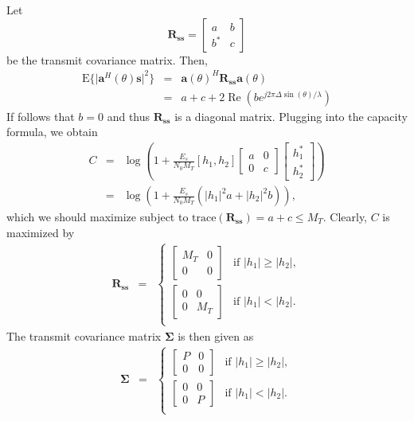 \documentclass[12pt]{article}
\begin{document}
\begin{enumerate}
Let $$\mathbf R_{\mathbf {ss}} = \begin{bmatrix} a & b \\ b^\ast & c \end{bmatrix} $$ be the transmit covariance matrix. Then,
\begin{eqnarray*}
	\mathrm{E}\{ \lvert \mathbf a^H(\theta) \mathbf s \rvert ^2 \} 
		&=& \mathbf a(\theta)^H \mathbf R_{\mathbf {ss}}\mathbf a(\theta) \\
		&=& a + c + 2 \mathop{\mathrm{Re}}(b e^{j 2\pi \Delta \sin(\theta) / \lambda}) 
\end{eqnarray*}
If follows that $b=0$ and thus $\mathbf{R_{ss}}$ is a diagonal matrix. Plugging into the capacity formula, we obtain 
\begin{eqnarray*}
	C &=& \log \left( 1 + \frac{E_s}{N_0 M_T}  [h_1, h_2] \begin{bmatrix} a & 0 \\ 0 & c\end{bmatrix} \begin{bmatrix} h_1^\ast \\ h_2^\ast \end{bmatrix} \right) \\
	&=& \log \left( 1 + \frac{E_s}{N_0 M_T}  \left( \lvert h_1\rvert^2 a +  \lvert h_2 \lvert^2 b \right) \right),
\end{eqnarray*}
which we should maximize subject to $\mathrm{trace}(\mathbf{R_{ss}}) = a+c \leq M_T$. Clearly, $C$ is maximized by
\begin{eqnarray*}
	\mathbf{R_{ss}} &=& \begin{cases}
	                    	\begin{bmatrix} M_T & 0 \\ 0 & 0 \end{bmatrix} & \text{if $\lvert h_1\rvert \geq \lvert h_2\rvert$}, \\[5mm]
	                    	\begin{bmatrix} 0 & 0 \\ 0 & M_T \end{bmatrix} & \text{if $\lvert h_1\rvert < \lvert h_2\rvert$}. \\
	                    \end{cases}
\end{eqnarray*}
The transmit covariance matrix $\pmb \Sigma$ is then given as 
\begin{eqnarray*}
	\pmb \Sigma &=& \begin{cases}
	                    	\begin{bmatrix} P & 0 \\ 0 & 0 \end{bmatrix} & \text{if $\lvert h_1\rvert \geq \lvert h_2\rvert$}, \\[5mm]
	                    	\begin{bmatrix} 0 & 0 \\ 0 & P \end{bmatrix} & \text{if $\lvert h_1\rvert < \lvert h_2\rvert$}. \\
	                    \end{cases}
\end{eqnarray*}



\end{enumerate}
\end{document}
